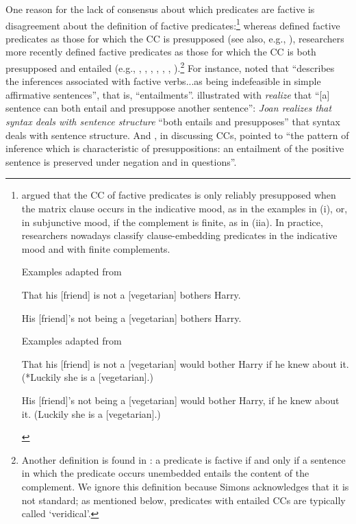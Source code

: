 \documentclass[11pt,fleqn]{article}
\newcommand{\6}{\mbox{$[\hspace*{-.6mm}[$}}
\newcommand{\9}{\mbox{$]\hspace*{-.6mm}]$}}
\begin{document}
One reason for the lack of consensus about which predicates are factive is disagreement about the definition of factive predicates:\footnote{\citet[56]{karttunen71b} argued that the CC of factive predicates is only reliably presupposed when the matrix clause occurs in the indicative mood, as in the examples in (i), or, in subjunctive mood, if the complement is finite, as in (iia). In practice, researchers nowadays classify clause-embedding predicates in the indicative mood and with finite complements.

\begin{exe}
 Examples adapted from \citealt[60]{karttunen71b}
\begin{xlist}
\ex That his [friend] is not a [vegetarian] bothers Harry. 

\ex His [friend]'s not being a [vegetarian] bothers Harry.

\end{xlist}
 Examples adapted from \citealt[60f.]{karttunen71b}
\begin{xlist}
\ex That his [friend] is not a [vegetarian] would bother Harry if he knew about it. (*Luckily she is a [vegetarian].)

\ex His [friend]'s not being a [vegetarian] would bother Harry, if he knew about it. (Luckily she is a [vegetarian].)

\end{xlist}
\end{exe}
} whereas \citealt{kiparsky-kiparsky70} defined factive predicates as those for which the CC is presupposed (see also, e.g., \citealt{karttunen71-implicative,karttunen71b}), researchers more recently defined factive predicates as those for which the CC is both presupposed and entailed (e.g., \citealt[119-123]{gazdar79a}, \citealt[355]{ccmg90}, \citealt[345]{vds92},  \citealt[3]{abbott06}, \citealt[139]{schlenker10}, \citealt[77]{anand-hacquard2014}, \citealt[fn.7]{spector-egre2015}).\footnote{Another definition is found in \citealt[1043]{simons07}: a predicate is factive if and only if a sentence in which the predicate occurs unembedded entails the content of the complement. We ignore this definition  because Simons acknowledges that it is not standard; as mentioned below, predicates with entailed CCs are typically called `veridical'. } For instance, \citet[66f.]{beaver01} noted that \citet[119-123]{gazdar79a} ``describes the inferences associated with factive verbs...as being indefeasible in simple affirmative sentences'', that is, ``entailments''. \citet[355]{ccmg90} illustrated with {\em realize} that ``[a] sentence can both entail and presuppose another sentence'': {\em Joan realizes that syntax deals with sentence structure} ``both entails and presupposes'' that syntax deals with sentence structure. And \citet[139]{schlenker10}, in discussing CCs, pointed to ``the pattern of inference which is characteristic of presuppositions: an entailment of the positive sentence is preserved under negation and in questions''.
\end{document}
